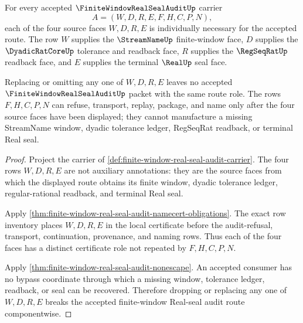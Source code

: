 \begin{theorem}
\label{thm:finite-window-real-seal-audit-four-face-minimality}
For every accepted $\FiniteWindowRealSealAuditUp$ carrier
$$
A=(W,D,R,E,F,H,C,P,N),
$$
each of the four source faces $W,D,R,E$ is individually necessary for the accepted route. The row $W$ supplies the $\StreamNameUp$ finite-window face, $D$ supplies the $\DyadicRatCoreUp$ tolerance and readback face, $R$ supplies the $\RegSeqRatUp$ readback face, and $E$ supplies the terminal $\RealUp$ seal face.

Replacing or omitting any one of $W,D,R,E$ leaves no accepted $\FiniteWindowRealSealAuditUp$ packet with the same route role. The rows $F,H,C,P,N$ can refuse, transport, replay, package, and name only after the four source faces have been displayed; they cannot manufacture a missing StreamName window, dyadic tolerance ledger, RegSeqRat readback, or terminal Real seal.
\end{theorem}
\begin{proof}
Project the carrier of \autoref{def:finite-window-real-seal-audit-carrier}. The four rows $W,D,R,E$ are not auxiliary annotations: they are the source faces from which the displayed route obtains its finite window, dyadic tolerance ledger, regular-rational readback, and terminal Real seal.

Apply \autoref{thm:finite-window-real-seal-audit-namecert-obligations}. The exact row inventory places $W,D,R,E$ in the local certificate before the audit-refusal, transport, continuation, provenance, and naming rows. Thus each of the four faces has a distinct certificate role not repeated by $F,H,C,P,N$.

Apply \autoref{thm:finite-window-real-seal-audit-nonescape}. An accepted consumer has no bypass coordinate through which a missing window, tolerance ledger, readback, or seal can be recovered. Therefore dropping or replacing any one of $W,D,R,E$ breaks the accepted finite-window Real-seal audit route componentwise.
\end{proof}

